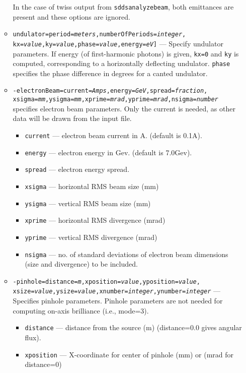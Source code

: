 \documentclass[11pt]{article}
\begin{document}
\begin{itemize}
\begin{itemize}
 In the case of twiss output from {\tt sddsanalyzebeam}, both emittances are present and these options
 are ignored.
\item {\tt undulator=period={\em meters},numberOfPeriods={\em integer},}\\ {\tt kx={\em value},ky={\em value},phase={\em value},energy={\em eV}]} --- 
 Specify undulator parameters.  If energy (of first-harmonic photons) is given, {\tt kx=0} and {\tt ky} is computed,
 corresponding to a horizontally deflecting undulator.
 {\tt phase} specifies the phase difference in degrees for a canted undulator.  
\item {\tt -electronBeam=current={\em Amps},energy={\em GeV},spread={\em fraction},}\\ {\tt xsigma={\em mm},ysigma={\em mm},xprime={\em mrad},yprime={\em mrad},nsigma={\em number}} specifies electron beam parameters.  Only the current is needed, as other data will be drawn from the input file.
 \begin{itemize}
   \item {\tt current} ---  electron beam current in A. (default is 0.1A).
   \item {\tt energy} ---   electron energy in Gev. (default is 7.0Gev).
   \item {\tt spread} ---   electron energy spread.
   \item {\tt xsigma} ---   horizontal RMS beam size (mm)
   \item {\tt ysigma} ---   vertical RMS beam size (mm)
   \item {\tt xprime} ---   horizontal RMS divergence (mrad)
   \item {\tt yprime} ---   vertical RMS divergence (mrad)
   \item {\tt nsigma} ---   no. of standard deviations of electron beam dimensions
     (size and divergence) to be included.
 \end{itemize}
\item {\tt -pinhole=distance={\em m},xposition={\em value},yposition={\em value},}\\ {\tt xsize={\em value},ysize={\em value},xnumber={\em integer},ynumber={\em integer}} --- Specifies pinhole parameters.
  Pinhole parameters are not needed for computing on-axis brilliance (i.e., mode=3). 
  \begin{itemize}
    \item {\tt distance} ---   distance from the source (m)  (distance=0.0 gives angular flux).
    \item {\tt xposition} ---  X-coordinate for center of pinhole (mm) or (mrad for distance=0) 

\end{itemize}
\end{itemize}
\end{itemize}
\end{document}
